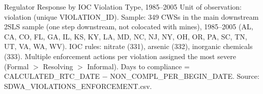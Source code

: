 
\begin{frame}{Regulator Response by IOC Violation Type, 1985--2005}
\label{tab:reg_response_ioc}
{\tiny Unit of observation: violation (unique VIOLATION\_ID). Sample: 349 CWSs in the main downstream 2SLS sample (one step downstream, not colocated with mines), 1985--2005 (AL, CA, CO, FL, GA, IL, KS, KY, LA, MD, NC, NJ, NY, OH, OR, PA, SC, TN, UT, VA, WA, WV). IOC rules: nitrate (331), arsenic (332), inorganic chemicals (333). Multiple enforcement actions per violation assigned the most severe (Formal $>$ Resolving $>$ Informal). Days to compliance = CALCULATED\_RTC\_DATE $-$ NON\_COMPL\_PER\_BEGIN\_DATE. Source: SDWA\_VIOLATIONS\_ENFORCEMENT.csv.}
\end{frame}
